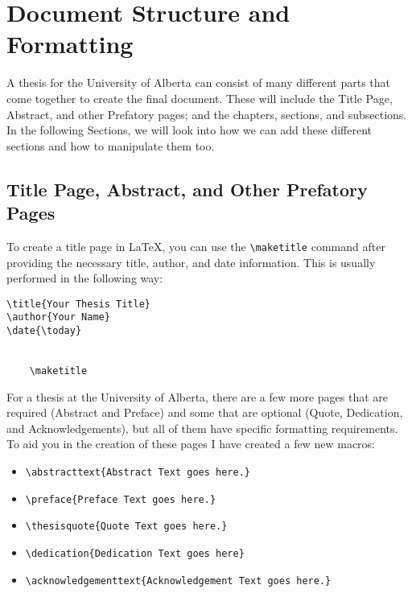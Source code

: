\chapter{Document Structure and Formatting}\label{ch:documentstructure}
	A thesis for the University of Alberta can consist of many different parts that come together to create the final document.
	These will include the Title Page, Abstract, and other Prefatory pages; and the chapters, sections, and subsections.
	In the following Sections, we will look into how we can add these different sections and how to manipulate them too.
	
	\section{Title Page, Abstract, and Other Prefatory Pages}
		To create a title page in \LaTeX, you can use the \lstinline|\maketitle| command after providing the necessary title, author, and date information. 
		This is usually performed in the following way:

		\begin{lstlisting}[style=LaTeXStyle]
\title{Your Thesis Title}
\author{Your Name}
\date{\today}


	\maketitle

		\end{lstlisting}

		For a thesis at the University of Alberta, there are a few more pages that are required (Abstract and Preface) and some that are optional (Quote, Dedication, and Acknowledgements), but all of them have specific formatting requirements.
		To aid you in the creation of these pages I have created a few new macros:
		\begin{itemize}
			\item \lstinline|\abstracttext{Abstract Text goes here.}|
			\item \lstinline|\preface{Preface Text goes here.}|
			\item \lstinline|\thesisquote{Quote Text goes here.}|
			\item \lstinline|\dedication{Dedication Text goes here}|
			\item \lstinline|\acknowledgementtext{Acknowledgement Text goes here.}|
		\end{itemize}

